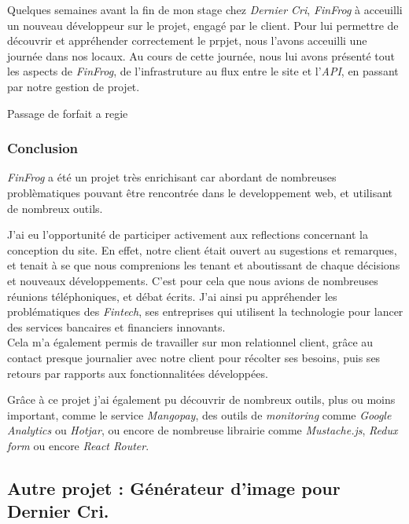 \documentclass[12pt,a4paper]{article}
\begin{document}
  Quelques semaines avant la fin de mon stage chez \emph{Dernier Cri},
  \emph{FinFrog} à acceuilli un nouveau développeur sur le projet, engagé
  par le client. Pour lui permettre de découvrir et appréhender
  correctement le prpjet, nous l'avons acceuilli une journée dans nos
  locaux. Au cours de cette journée, nous lui avons présenté tout les
  aspects de \emph{FinFrog}, de l'infrastruture au flux entre le site et
  l'\emph{API}, en passant par notre gestion de projet.

  \bigskip

  Passage de forfait a regie

  \subsubsection{Conclusion}\label{conclusion-1}

  \emph{FinFrog} a été un projet très enrichisant car abordant de
  nombreuses problèmatiques pouvant être rencontrée dans le developpement
  web, et utilisant de nombreux outils.

  \bigskip

  J'ai eu l'opportunité de participer activement aux reflections
  concernant la conception du site. En effet, notre client était ouvert au
  sugestions et remarques, et tenait à se que nous comprenions les tenant
  et aboutissant de chaque décisions et nouveaux développements. C'est
  pour cela que nous avions de nombreuses réunions téléphoniques, et débat
  écrits. J'ai ainsi pu appréhender les problématiques des \emph{Fintech},
  ses entreprises qui utilisent la technologie pour lancer des services
  bancaires et financiers innovants.\\
  Cela m'a également permis de travailler sur mon relationnel client,
  grâce au contact presque journalier avec notre client pour récolter ses
  besoins, puis ses retours par rapports aux fonctionnalitées développées.

  \bigskip

  Grâce à ce projet j'ai également pu découvrir de nombreux outils, plus
  ou moins important, comme le service \emph{Mangopay}, des outils de
  \emph{monitoring} comme \emph{Google Analytics} ou \emph{Hotjar}, ou
  encore de nombreuse librairie comme \emph{Mustache.js}, \emph{Redux
  form} ou encore \emph{React Router}.

  \bigskip

  \subsection{Autre projet : Générateur d'image pour Dernier
  Cri.}\label{autre-projet-guxe9nuxe9rateur-dimage-pour-dernier-cri.}
\end{document}
